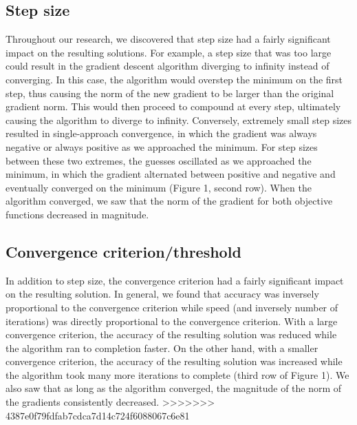 \documentclass{article}
\begin{document}
\subsection{Step size}
Throughout our research, we discovered that step size had a fairly significant impact on the resulting solutions. For example, a step size that was too large could result in the gradient descent algorithm diverging to infinity instead of converging. In this case, the algorithm would overstep the minimum on the first step, thus causing the norm of the new gradient to be larger than the original gradient norm. This would then proceed to compound at every step, ultimately causing the algorithm to diverge to infinity. Conversely, extremely small step sizes resulted in single-approach convergence, in which the gradient was always negative or always positive as we approached the minimum. For step sizes between these two extremes, the guesses oscillated as we approached the minimum, in which the gradient alternated between positive and negative and eventually converged on the minimum (Figure 1, second row). When the algorithm converged, we saw that the norm of the gradient for both objective functions decreased in magnitude. 

\subsection{Convergence criterion/threshold}
In addition to step size, the convergence criterion had a fairly significant impact on the resulting solution. In general, we found that accuracy was inversely proportional to the convergence criterion while speed (and inversely number of iterations) was directly proportional to the convergence criterion. With a large convergence criterion, the accuracy of the resulting solution was reduced while the algorithm ran to completion faster. On the other hand, with a smaller convergence criterion, the accuracy of the resulting solution was increased while the algorithm took many more iterations to complete (third row of Figure 1). We also saw that as long as the algorithm converged, the magnitude of the norm of the gradients consistently decreased. 
>>>>>>> 4387e0f79fdfab7cdca7d14c724f6088067c6e81
\end{document}
